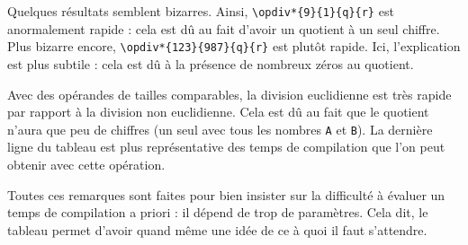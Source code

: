 \documentclass[12pt]{report}
\begin{document}
Quelques résultats semblent bizarres. Ainsi,
\verb+\opdiv*{9}{1}{q}{r}+ est anormalement rapide : cela est dû
au fait d'avoir un quotient à un seul chiffre. Plus bizarre encore,
\verb+\opdiv*{123}{987}{q}{r}+ est plutôt rapide. Ici,
l'explication est plus subtile : cela est dû à la présence de nombreux
zéros au quotient.

Avec des opérandes de tailles comparables, la division euclidienne est
très rapide par rapport à la division non euclidienne. Cela est dû au
fait que le quotient n'aura que peu de chiffres (un seul avec tous les
nombres \texttt{A} et \texttt{B}). La dernière ligne du tableau est
plus représentative des temps de compilation que l'on peut obtenir
avec cette opération.

Toutes ces remarques sont faites pour bien insister sur la difficulté
à évaluer un temps de compilation a priori : il dépend de trop de
paramètres. Cela dit, le tableau permet d'avoir quand même une idée de
ce à quoi il faut s'attendre.

\clearpage
\end{document}
